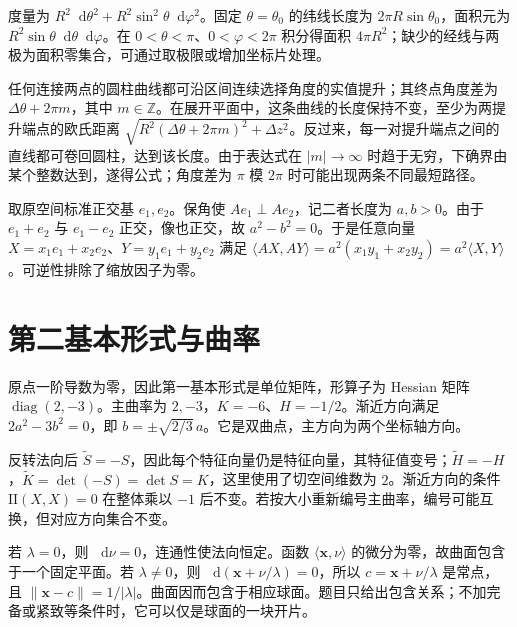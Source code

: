 \documentclass[UTF8,12pt,a4paper,fontset=fandol]{ctexbook}
\newcommand{\dd}{\mathop{}\!\mathrm d}
\newcommand{\ip}[2]{\langle #1,#2\rangle}
\newcommand{\norm}[1]{\lVert #1\rVert}
\begin{document}
\begin{solve}
度量为 $R^2\dd\theta^2+R^2\sin^2\theta\dd\varphi^2$。固定 $\theta=\theta_0$ 的纬线长度为 $2\pi R\sin\theta_0$，面积元为 $R^2\sin\theta\dd\theta\dd\varphi$。在 $0<\theta<\pi$、$0<\varphi<2\pi$ 积分得面积 $4\pi R^2$；缺少的经线与两极为面积零集合，可通过取极限或增加坐标片处理。
\end{solve}

\begin{solve}
任何连接两点的圆柱曲线都可沿区间连续选择角度的实值提升；其终点角度差为 $\Delta\theta+2\pi m$，其中 $m\in\mathbb Z$。在展开平面中，这条曲线的长度保持不变，至少为两提升端点的欧氏距离 $\sqrt{R^2(\Delta\theta+2\pi m)^2+\Delta z^2}$。反过来，每一对提升端点之间的直线都可卷回圆柱，达到该长度。由于表达式在 $|m|\to\infty$ 时趋于无穷，下确界由某个整数达到，遂得公式；角度差为 $\pi$ 模 $2\pi$ 时可能出现两条不同最短路径。
\end{solve}

\begin{solve}
取原空间标准正交基 $e_1,e_2$。保角使 $Ae_1\perp Ae_2$，记二者长度为 $a,b>0$。由于 $e_1+e_2$ 与 $e_1-e_2$ 正交，像也正交，故 $a^2-b^2=0$。于是任意向量 $X=x_1e_1+x_2e_2$、$Y=y_1e_1+y_2e_2$ 满足 $\ip{AX}{AY}=a^2(x_1y_1+x_2y_2)=a^2\ip XY$。可逆性排除了缩放因子为零。
\end{solve}

\section{第二基本形式与曲率}
\begin{solve}
原点一阶导数为零，因此第一基本形式是单位矩阵，形算子为 Hessian 矩阵 $\operatorname{diag}(2,-3)$。主曲率为 $2,-3$，$K=-6$、$H=-1/2$。渐近方向满足 $2a^2-3b^2=0$，即 $b=\pm\sqrt{2/3}\,a$。它是双曲点，主方向为两个坐标轴方向。
\end{solve}

\begin{solve}
反转法向后 $\widetilde S=-S$，因此每个特征向量仍是特征向量，其特征值变号；$\widetilde H=-H$，$\widetilde K=\det(-S)=\det S=K$，这里使用了切空间维数为 $2$。渐近方向的条件 $\mathrm{II}(X,X)=0$ 在整体乘以 $-1$ 后不变。若按大小重新编号主曲率，编号可能互换，但对应方向集合不变。
\end{solve}

\begin{solve}
若 $\lambda=0$，则 $\dd\nu=0$，连通性使法向恒定。函数 $\ip{\mathbf x}\nu$ 的微分为零，故曲面包含于一个固定平面。若 $\lambda\ne0$，则 $\dd(\mathbf x+\nu/\lambda)=0$，所以 $c=\mathbf x+\nu/\lambda$ 是常点，且 $\norm{\mathbf x-c}=1/|\lambda|$。曲面因而包含于相应球面。题目只给出包含关系；不加完备或紧致等条件时，它可以仅是球面的一块开片。
\end{solve}
\end{document}
